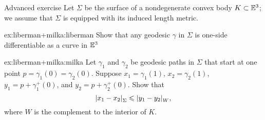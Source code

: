 \begin{thm}{Advanced exercise}\label{ex:liberman+milka}
Let $\Sigma$ be the surface of a nondegenerate convex body $K\subset\mathbb{E}^3$;
we assume that $\Sigma$ is equipped with its induced length metric.

\begin{subthm}{ex:liberman+milka:liberman}
Show that any geodesic $\gamma$ in $\Sigma$ is one-side differentiable as a curve in $\mathbb{E}^3$ 
\end{subthm}

\begin{subthm}{ex:liberman+milka:milka}
Let $\gamma_1$ and $\gamma_2$ be geodesic paths in $\Sigma$ that start at one point $p=\gamma_1(0)=\gamma_2(0)$.
Suppose $x_1=\gamma_1(1)$, $x_2=\gamma_2(1)$, $y_1=p+\gamma_1^+(0)$, and $y_2=p+\gamma_2^+(0)$.
Show that 
\[\dist{x_1}{x_2}{\Sigma}\le \dist{y_1}{y_2}{W},\]
where $W$ is the complement to the interior of $K$.
\end{subthm}

\end{thm}

